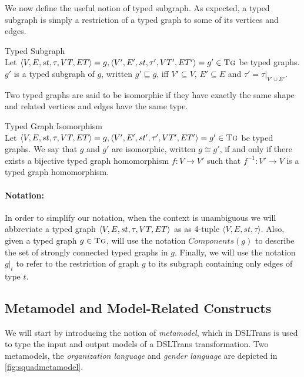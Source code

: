 We now define the useful notion of typed subgraph. As expected, a typed subgraph is simply a restriction of a typed graph to some of its vertices and edges. 

\begin{definition}{Typed Subgraph\\}
\label{def:typedsubgraph}
Let $\langle V,E,st,\tau,VT,ET\rangle=g,\langle V',E',st,\tau',VT',ET'\rangle=g'\in \textsc{Tg}$ be typed graphs. $g'$ is a typed subgraph of $g$, written $g'\sqsubseteq g$, iff $V'\subseteq V$, $E'\subseteq E$ and $\tau'=\tau |_{V'\cup E'}$.

\end{definition} 


Two typed graphs are said to be isomorphic if they have exactly the same shape and related vertices and edges have the same type.


\begin{definition}{Typed Graph Isomorphism\\}
\label{def:typed_graph_isomorphism}
Let $\langle V,E,st,\tau,VT,ET\rangle=g,\langle V',E',st',\tau',VT',ET'\rangle=g'\in \textsc{Tg}$ be typed graphs. We say that $g$ and $g'$ are isomorphic, written $g\cong g'$, if and only if there exists a bijective typed graph homomorphism $f:V\rightarrow V'$ such that $f^{-1}:V'\rightarrow V$ is a typed graph homomorphism.
\end{definition}

\paragraph{\textbf{Notation:}}
In order to simplify our notation, when the context is unambiguous we will abbreviate a typed graph $\langle V,E,st,\\\tau,VT, ET\rangle$ as as 4-tuple $\langle V,E,st,\tau\rangle$. Also, given a typed graph $g\in \textsc{Tg}$, will use the notation $Components(g)$ to describe the set of strongly connected typed graphs in $g$. Finally, we will use the notation $g|_{t}$ to refer to the restriction of graph $g$ to its subgraph containing only edges of type $t$.

\subsection{Metamodel and Model-Related Constructs}
\label{sec:DSLTrans_formal}

We will start by introducing the notion of \emph{metamodel}, which in DSLTrans is used to type the input and output models of a DSLTrans transformation.  Two metamodels, the \emph{organization language} and \emph{gender language} are depicted in \cref{fig:squadmetamodel}.

